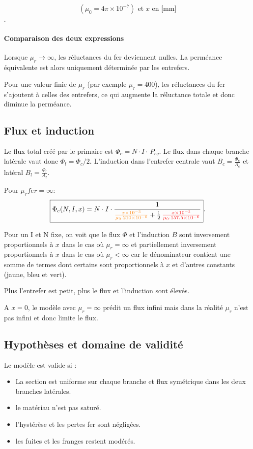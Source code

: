 \[(\mu_0 = 4\pi \times 10^{-7}) \text{ et } x \text{ en [mm]}\] .

\paragraph{Comparaison des deux expressions}

Lorsque $\mu_r \to \infty$, les réluctances du fer deviennent nulles. La perméance équivalente est alors uniquement déterminée par les entrefers.

Pour une valeur finie de $\mu_r$ (par exemple $\mu_r = 400$), les réluctances du fer s'ajoutent à celles des entrefers, ce qui augmente la réluctance totale et donc diminue la perméance.

\subsection{Flux et induction}
Le flux total créé par le primaire est \(\Phi_c=N\cdot I\cdot\,P_{eq}\). Le flux dans chaque branche latérale vaut donc \(\Phi_l = \Phi_c/2\).
L'induction dans l'entrefer centrale vaut \(B_c = \frac{\Phi_c}{A_c}\) et latéral \(B_l = \frac{\Phi_l}{A_l}\).

Pour \(\mu_r fer = \infty\):
\[
\boxed{\Phi_c(N, I, x) = N \cdot I \cdot
\frac{1}{
\textcolor{orange}{\frac{x \times 10^{-3}}{\mu_0 \cdot 210 \times 10^{-6}}}
+
\frac{1}{2}\,\textcolor{red}{\frac{x \times 10^{-3}}{\mu_0 \cdot 157.5 \times 10^{-6}}}
}}.
\]

Pour un I et N fixe, on voit que le flux \(\Phi\) et l'induction \(B\) sont inversement proportionnels à \(x\) dans le cas où \(\mu_r = \infty\) 
et partiellement inversement proportionnels à \(x\) dans le cas où \(\mu_r < \infty\) 
car le dénominateur contient une somme de termes dont certains sont proportionnels à \(x\) et d'autres constants (jaune, bleu et vert).

Plus l'entrefer est petit, plus le flux et l'induction sont élevés.

A \(x=0\), le modèle avec \(\mu_r=\infty\) prédit un flux infini mais dans la réalité \(\mu_r\) n'est pas infini et donc limite le flux.

\subsection{Hypothèses et domaine de validité}
Le modèle est valide si :
\begin{itemize}
\item La section est uniforme sur chaque branche et flux symétrique dans les deux branches latérales.
\item le matériau n'est pas saturé.
\item l'hystérèse et les pertes fer sont négligées.
\item les fuites et les franges restent modérés.
\end{itemize}

